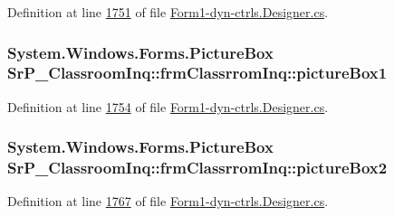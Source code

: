 \-Definition at line \hyperlink{_form1-dyn-ctrls_8_designer_8cs_source_l01751}{1751} of file \hyperlink{_form1-dyn-ctrls_8_designer_8cs_source}{\-Form1-\/dyn-\/ctrls.\-Designer.\-cs}.

\hypertarget{class_sr_p___classroom_inq_1_1frm_classrrom_inq_ab971146df86e1277868bef4199a7b8f4}{
\subsubsection[{picture\-Box1}]{\setlength{\rightskip}{0pt plus 5cm}\-System.\-Windows.\-Forms.\-Picture\-Box {\bf \-Sr\-P\-\_\-\-Classroom\-Inq\-::frm\-Classrrom\-Inq\-::picture\-Box1}}}
\label{class_sr_p___classroom_inq_1_1frm_classrrom_inq_ab971146df86e1277868bef4199a7b8f4}


\-Definition at line \hyperlink{_form1-dyn-ctrls_8_designer_8cs_source_l01754}{1754} of file \hyperlink{_form1-dyn-ctrls_8_designer_8cs_source}{\-Form1-\/dyn-\/ctrls.\-Designer.\-cs}.

\hypertarget{class_sr_p___classroom_inq_1_1frm_classrrom_inq_aeb268a5866f810521414bd3fd047ca72}{
\subsubsection[{picture\-Box2}]{\setlength{\rightskip}{0pt plus 5cm}\-System.\-Windows.\-Forms.\-Picture\-Box {\bf \-Sr\-P\-\_\-\-Classroom\-Inq\-::frm\-Classrrom\-Inq\-::picture\-Box2}}}
\label{class_sr_p___classroom_inq_1_1frm_classrrom_inq_aeb268a5866f810521414bd3fd047ca72}


\-Definition at line \hyperlink{_form1-dyn-ctrls_8_designer_8cs_source_l01767}{1767} of file \hyperlink{_form1-dyn-ctrls_8_designer_8cs_source}{\-Form1-\/dyn-\/ctrls.\-Designer.\-cs}.

